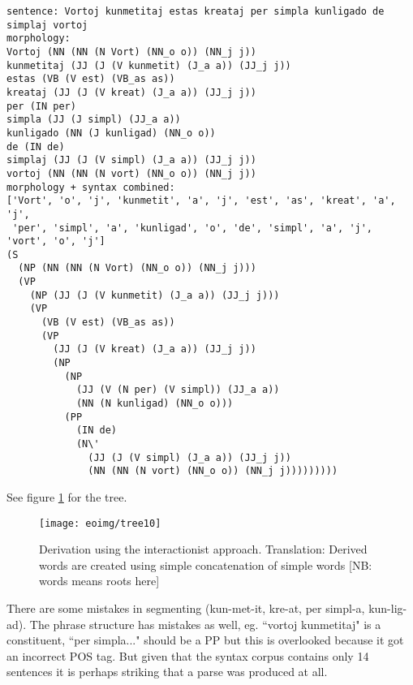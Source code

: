 \documentclass[10pt,a4paper]{article}
\begin{document}
\begin{verbatim}
sentence: Vortoj kunmetitaj estas kreataj per simpla kunligado de simplaj vortoj
morphology:
Vortoj (NN (NN (N Vort) (NN_o o)) (NN_j j))
kunmetitaj (JJ (J (V kunmetit) (J_a a)) (JJ_j j))
estas (VB (V est) (VB_as as))
kreataj (JJ (J (V kreat) (J_a a)) (JJ_j j))
per (IN per)
simpla (JJ (J simpl) (JJ_a a))
kunligado (NN (J kunligad) (NN_o o))
de (IN de)
simplaj (JJ (J (V simpl) (J_a a)) (JJ_j j))
vortoj (NN (NN (N vort) (NN_o o)) (NN_j j))
morphology + syntax combined:
['Vort', 'o', 'j', 'kunmetit', 'a', 'j', 'est', 'as', 'kreat', 'a', 'j', 
 'per', 'simpl', 'a', 'kunligad', 'o', 'de', 'simpl', 'a', 'j', 'vort', 'o', 'j']
(S
  (NP (NN (NN (N Vort) (NN_o o)) (NN_j j)))
  (VP
    (NP (JJ (J (V kunmetit) (J_a a)) (JJ_j j)))
    (VP
      (VB (V est) (VB_as as))
      (VP
        (JJ (J (V kreat) (J_a a)) (JJ_j j))
        (NP
          (NP
            (JJ (V (N per) (V simpl)) (JJ_a a))
            (NN (N kunligad) (NN_o o)))
          (PP
            (IN de)
            (N\'
              (JJ (J (V simpl) (J_a a)) (JJ_j j))
              (NN (NN (N vort) (NN_o o)) (NN_j j)))))))))
\end{verbatim}

See figure \ref{s3} for the tree.

\begin{figure}
\centering
\texttt{[image: eoimg/tree10]}
\caption{Derivation using the interactionist approach. Translation: Derived words are created using simple concatenation of simple words [NB: words means roots here]}
\label{s3}
\end{figure}

There are some mistakes in segmenting (kun-met-it, kre-at, per simpl-a,
kun-lig-ad).  The phrase structure has mistakes as well, eg. ``vortoj
kunmetitaj" is a constituent, ``per simpla..." should be a PP but this is
overlooked because it got an incorrect POS tag. But given that the syntax
corpus contains only 14 sentences it is perhaps striking that a parse was
produced at all.
\end{document}
